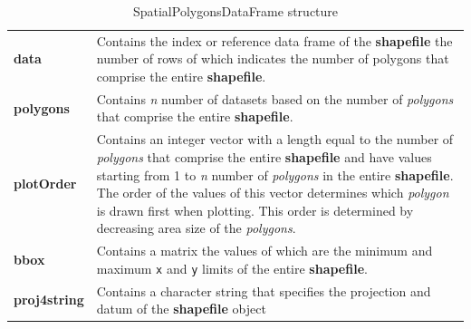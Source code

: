 \documentclass[12pt,a4paper,a4paper]{book}
\theoremstyle{definition}
\theoremstyle{definition}
\theoremstyle{definition}
\theoremstyle{remark}
\begin{document}
\begin{longtable}[]{@{}ll@{}}
\caption{\label{tab:table2} SpatialPolygonsDataFrame
structure}\tabularnewline
\toprule
\begin{minipage}[t]{0.32\columnwidth}\raggedright
\textbf{data}\strut
\end{minipage} & \begin{minipage}[t]{0.62\columnwidth}\raggedright
Contains the index or reference data frame of the \textbf{shapefile} the
number of rows of which indicates the number of polygons that comprise
the entire \textbf{shapefile}.\strut
\end{minipage}\tabularnewline
\begin{minipage}[t]{0.32\columnwidth}\raggedright
\textbf{polygons}\strut
\end{minipage} & \begin{minipage}[t]{0.62\columnwidth}\raggedright
Contains \emph{n} number of datasets based on the number of
\emph{polygons} that comprise the entire \textbf{shapefile}.\strut
\end{minipage}\tabularnewline
\begin{minipage}[t]{0.32\columnwidth}\raggedright
\textbf{plotOrder}\strut
\end{minipage} & \begin{minipage}[t]{0.62\columnwidth}\raggedright
Contains an integer vector with a length equal to the number of
\emph{polygons} that comprise the entire \textbf{shapefile} and have
values starting from 1 to \emph{n} number of \emph{polygons} in the
entire \textbf{shapefile}. The order of the values of this vector
determines which \emph{polygon} is drawn first when plotting. This order
is determined by decreasing area size of the \emph{polygons}.\strut
\end{minipage}\tabularnewline
\begin{minipage}[t]{0.32\columnwidth}\raggedright
\textbf{bbox}\strut
\end{minipage} & \begin{minipage}[t]{0.62\columnwidth}\raggedright
Contains a matrix the values of which are the minimum and maximum
\texttt{x} and \texttt{y} limits of the entire \textbf{shapefile}.\strut
\end{minipage}\tabularnewline
\begin{minipage}[t]{0.32\columnwidth}\raggedright
\textbf{proj4string}\strut
\end{minipage} & \begin{minipage}[t]{0.62\columnwidth}\raggedright
Contains a character string that specifies the projection and datum of
the \textbf{shapefile} object\strut
\end{minipage}\tabularnewline
\bottomrule
\end{longtable}
\end{document}
